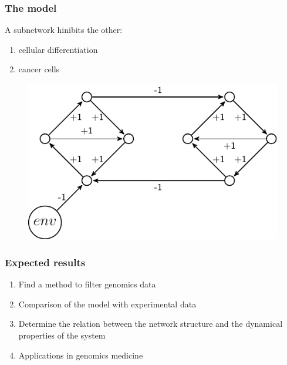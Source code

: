 \documentclass{beamer}
\begin{document}
\begin{frame}
\frametitle{The model}
A subnetwork hinibits the other: 
\begin{enumerate}
\item cellular differentiation 
\item cancer cells
\end {enumerate}
\begin{figure}[scale=0.5]
\includegraphics{grn.pdf}
\end{figure}
\end{frame}




\begin{frame}
\frametitle{Expected results}
\begin{enumerate}
\item Find a method to filter genomics data
\item Comparison of the model with experimental data
\item Determine the relation between the network structure and the dynamical properties of the system
\item Applications in genomics medicine

\end{enumerate}
\end{frame}
\end{document}
